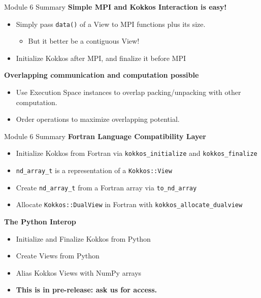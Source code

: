 




\begin{frame}{Module 6 Summary}
\textbf{Simple MPI and Kokkos Interaction is easy!}
\begin{itemize}
  \item Simply pass \texttt{data()} of a View to MPI functions plus its size.
  \begin{itemize}
    \item But it better be a contiguous View!
  \end{itemize}
  \item Initialize Kokkos after MPI, and finalize it before MPI
\end{itemize}

\vspace{10pt}
\textbf{Overlapping communication and computation possible}
\begin{itemize}
  \item Use Execution Space instances to overlap packing/unpacking with other computation.
  \item Order operations to maximize overlapping potential. 
\end{itemize}
\end{frame}

\begin{frame}[fragile]{Module 6 Summary}
\textbf{Fortran Language Compatibility Layer}
\begin{itemize}
  \item Initialize Kokkos from Fortran via \texttt{kokkos\_initialize} and \texttt{kokkos\_finalize}
  \item \texttt{nd\_array\_t} is a representation of a \texttt{Kokkos::View}
  \item Create \texttt{nd\_array\_t} from a Fortran array via \texttt{to\_nd\_array}
  \item Allocate \texttt{Kokkos::DualView} in Fortran with \texttt{kokkos\_allocate\_dualview}
\end{itemize}


  \vspace{10pt}
  \textbf{The Python Interop}
  \begin{itemize}
    \item Initialize and Finalize Kokkos from Python
    \item Create Views from Python
    \item Alias Kokkos Views with NumPy arrays
    \item \textbf{This is in pre-release: ask us for access.}
  \end{itemize}
\end{frame}

